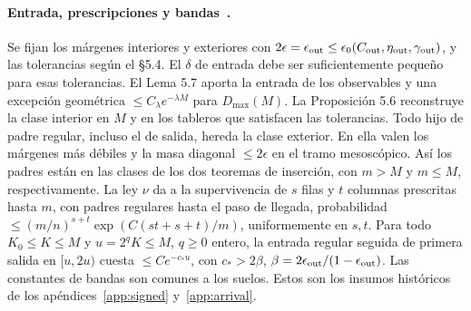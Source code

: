 \paragraph{Entrada, prescripciones y bandas~\cite[\S5, lemas 5.2, 5.7 y prop.~5.6, 5.8]{tc}.}
Se fijan los márgenes interiores y exteriores con
\(2\epsilon=\epsilon_{\rm out}\le\epsilon_0(C_{\rm out},\eta_{\rm out},\gamma_{\rm out})\),
y las tolerancias según el §5.4. El \(\delta\) de entrada debe ser suficientemente pequeño
para esas tolerancias. El Lema 5.7 aporta la entrada de los observables y una excepción
geométrica \(\le C_\lambda e^{-\lambda M}\) para \(D_{\max}(M)\).
La Proposición 5.6 reconstruye la clase interior en \(M\) y en los tableros que satisfacen
las tolerancias. Todo hijo de padre regular, incluso el de salida, hereda la clase exterior.
En ella valen los márgenes más débiles y la masa diagonal \(\le2\epsilon\) en el tramo
mesoscópico. Así los padres están en las clases de los dos teoremas de inserción,
con \(m>M\) y \(m\le M\), respectivamente. La ley \(\nu\) da a la supervivencia de
\(s\) filas y \(t\) columnas prescritas hasta \(m\), con padres regulares hasta el paso de
llegada, probabilidad \(\le(m/n)^{s+t}\exp(C(st+s+t)/m)\), uniformemente en \(s,t\).
Para todo \(K_0\le K\le M\) y \(u=2^qK\le M\), \(q\ge0\) entero, la entrada regular
seguida de primera salida en \([u,2u)\) cuesta \(\le C e^{-c_*u}\),
con \(c_*>2\beta\), \(\beta=2\epsilon_{\rm out}/(1-\epsilon_{\rm out})\).
Las constantes de bandas son comunes a los suelos. Estos son los insumos históricos de
los apéndices~\ref{app:signed} y~\ref{app:arrival}.


